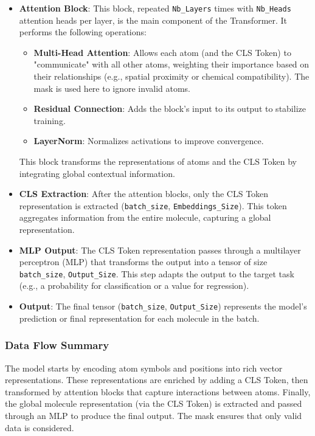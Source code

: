 \documentclass{article}
\begin{document}
\begin{itemize}
    \item \textbf{Attention Block}: This block, repeated \texttt{Nb\_Layers} times with \texttt{Nb\_Heads} attention heads per layer, is the main component of the Transformer. It performs the following operations:
    \begin{itemize}
        \item \textbf{Multi-Head Attention}: Allows each atom (and the CLS Token) to "communicate" with all other atoms, weighting their importance based on their relationships (e.g., spatial proximity or chemical compatibility). The mask is used here to ignore invalid atoms.
        \item \textbf{Residual Connection}: Adds the block’s input to its output to stabilize training.
        \item \textbf{LayerNorm}: Normalizes activations to improve convergence.
    \end{itemize}
    This block transforms the representations of atoms and the CLS Token by integrating global contextual information.
    \item \textbf{CLS Extraction}: After the attention blocks, only the CLS Token representation is extracted (\texttt{batch\_size}, \texttt{Embeddings\_Size}). This token aggregates information from the entire molecule, capturing a global representation.
    \item \textbf{MLP Output}: The CLS Token representation passes through a multilayer perceptron (MLP) that transforms the output into a tensor of size \texttt{batch\_size}, \texttt{Output\_Size}. This step adapts the output to the target task (e.g., a probability for classification or a value for regression).
    \item \textbf{Output}: The final tensor (\texttt{batch\_size}, \texttt{Output\_Size}) represents the model’s prediction or final representation for each molecule in the batch.
\end{itemize}

\subsubsection{Data Flow Summary}
The model starts by encoding atom symbols and positions into rich vector representations. These representations are enriched by adding a CLS Token, then transformed by attention blocks that capture interactions between atoms. Finally, the global molecule representation (via the CLS Token) is extracted and passed through an MLP to produce the final output. The mask ensures that only valid data is considered. \newline
\end{document}

